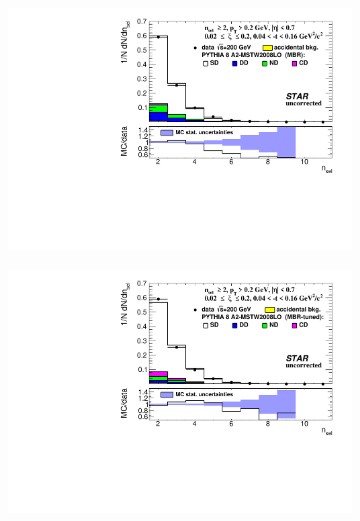 \begin{figure}[t!]
	\vspace{-1.5cm}
	\centering
	\begin{subfigure}{.49\textwidth}
		\includegraphics[width=\linewidth, page=1]{chapters/chrgSTAR/img/nonSD/chrg/SDT_pythia_xi0_RP_starsim_nsel.pdf}
	\end{subfigure}
	\begin{subfigure}{.49\textwidth}
		\includegraphics[width=\linewidth, page=1]{chapters/chrgSTAR/img/nonSD/chrg/SDT_pythia_xi0_option2_RP_starsim_nsel.pdf}
	\end{subfigure}
	\begin{subfigure}{.49\textwidth}

\end{subfigure}
\end{figure}
